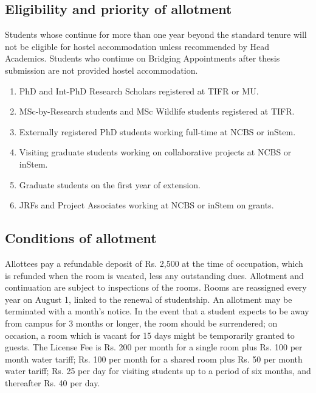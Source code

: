 \documentclass[a4paper,10pt]{article}
\begin{document}
\subsection{Eligibility and priority of allotment}
Students whose continue for more than one year
beyond the standard tenure will not be eligible for hostel accommodation unless
recommended by Head Academics. Students who continue on Bridging Appointments after
thesis submission are not provided hostel accommodation.

\begin{enumerate}
    \item  PhD and Int-PhD Research Scholars registered at TIFR or MU.
    \item  MSc-by-Research students and MSc Wildlife students registered at TIFR.
    \item  Externally registered PhD students working full-time at NCBS or inStem.
    \item  Visiting graduate students working on collaborative projects at NCBS or inStem.
    \item  Graduate students on the first year of extension.
    \item  JRFs and Project Associates working at NCBS or inStem on grants.
\end{enumerate}

\subsection{Conditions of allotment}
Allottees pay a refundable deposit of Rs. 2,500 at the time of
occupation, which is refunded when the room is vacated, less any outstanding dues.
Allotment and continuation are subject to inspections of the rooms. Rooms are reassigned
every year on August 1, linked to the renewal of studentship. An allotment may be
terminated with a month’s notice. In the event that a student expects to be away from
campus for 3 months or longer, the room should be surrendered; on occasion, a room which
is vacant for 15 days might be temporarily granted to guests. The License Fee is Rs. 200 per
month for a single room plus Rs. 100 per month water tariff; Rs. 100 per month for a shared
room plus Rs. 50 per month water tariff; Rs. 25 per day for visiting students up to a period
of six months, and thereafter Rs. 40 per day.
\end{document}
